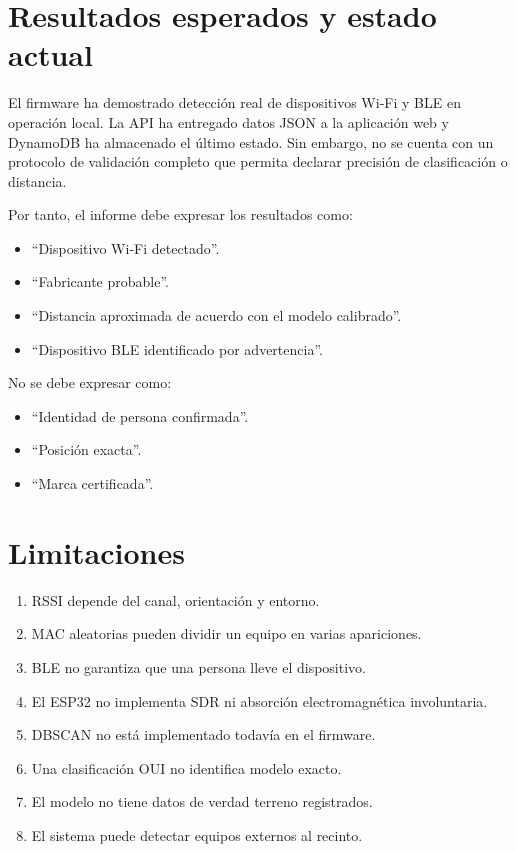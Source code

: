 \documentclass[12pt,a4paper]{article}
\begin{document}
\section{Resultados esperados y estado actual}
El firmware ha demostrado detección real de dispositivos Wi-Fi y BLE en operación local. La API ha entregado datos JSON a la aplicación web y DynamoDB ha almacenado el último estado. Sin embargo, no se cuenta con un protocolo de validación completo que permita declarar precisión de clasificación o distancia.

Por tanto, el informe debe expresar los resultados como:
\begin{itemize}
\item ``Dispositivo Wi-Fi detectado''.
\item ``Fabricante probable''.
\item ``Distancia aproximada de acuerdo con el modelo calibrado''.
\item ``Dispositivo BLE identificado por advertencia''.
\end{itemize}
No se debe expresar como:
\begin{itemize}
\item ``Identidad de persona confirmada''.
\item ``Posición exacta''.
\item ``Marca certificada''.
\end{itemize}

\section{Limitaciones}
\begin{enumerate}
\item RSSI depende del canal, orientación y entorno.
\item MAC aleatorias pueden dividir un equipo en varias apariciones.
\item BLE no garantiza que una persona lleve el dispositivo.
\item El ESP32 no implementa SDR ni absorción electromagnética involuntaria.
\item DBSCAN no está implementado todavía en el firmware.
\item Una clasificación OUI no identifica modelo exacto.
\item El modelo no tiene datos de verdad terreno registrados.
\item El sistema puede detectar equipos externos al recinto.
\end{enumerate}
\end{document}
